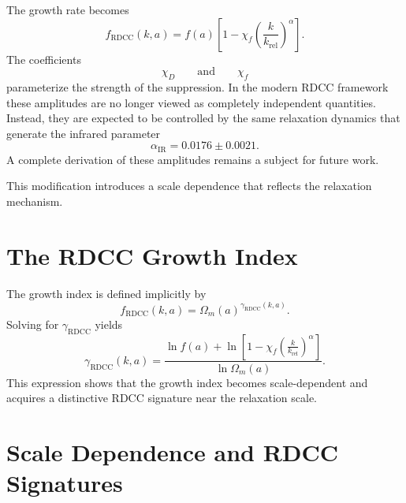 \documentclass[11pt,a4paper]{article}
\begin{document}
The growth rate becomes
\begin{equation}
  f_{\mathrm{RDCC}}(k,a)
  =
  f(a)
  \left[
    1
    -
    \chi_{f}
    \left(
      \frac{k}{k_{\mathrm{rel}}}
    \right)^{\alpha}
  \right].
\end{equation}
The coefficients
\begin{equation}
  \chi_{D}
  \qquad\text{and}\qquad
  \chi_{f}
\end{equation}
parameterize the strength of the suppression. In the modern RDCC framework
these amplitudes are no longer viewed as completely independent quantities.
Instead, they are expected to be controlled by the same relaxation dynamics
that generate the infrared parameter
\begin{equation}
  \alpha_{\mathrm{IR}}
  =
  0.0176 \pm 0.0021.
\end{equation}
A complete derivation of these amplitudes remains a subject for future work.

This modification introduces a scale dependence that reflects the relaxation
mechanism.

\section{The RDCC Growth Index}

The growth index is defined implicitly by
\begin{equation}
  f_{\mathrm{RDCC}}(k,a)
  =
  \Omega_{m}(a)^{\gamma_{\mathrm{RDCC}}(k,a)}.
\end{equation}
Solving for \(\gamma_{\mathrm{RDCC}}\) yields
\begin{equation}
  \gamma_{\mathrm{RDCC}}(k,a)
  =
  \frac{
    \ln f(a)
    +
    \ln
    \left[
      1
      -
      \chi_{f}
      \left(
        \frac{k}{k_{\mathrm{rel}}}
      \right)^{\alpha}
    \right]
  }{
    \ln \Omega_{m}(a)
  }.
\end{equation}
This expression shows that the growth index becomes scale-dependent and
acquires a distinctive RDCC signature near the relaxation scale.

\section{Scale Dependence and RDCC Signatures}
\end{document}
